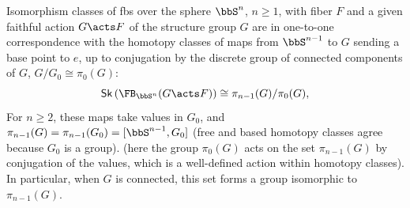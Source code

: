\begin{cor}
     Isomorphism classes of \glspl{fb} over the sphere $\bbS^n$, $n\geq 1$, with fiber $F$ and a given faithful action $G\acts F$ of the structure group $G$ are in one-to-one correspondence with the homotopy classes of maps from $\bbS^{n-1}$ to $G$ sending a base point to $e$, up to conjugation by the discrete group of connected components of $G$, $G\slash G_0\cong \pi_0(G)$:
    \[
    \mathsf{Sk}\left(\FB_{\bbS^n}(G\acts F)\right)\cong \pi_{n-1}(G)/\pi_0(G),\label{FB(G) and homotopy(G)}
    \]
    For $n\geq 2$, these maps take values in $G_0$, and $\pi_{n-1}(G)=\pi_{n-1}(G_0)=[\bbS^{n-1},G_0]$ (free and based homotopy classes agree because $G_0$ is a group).
    (here the group $\pi_0(G)$ acts on the set $\pi_{n-1}(G)$ by conjugation of the values, which is a well-defined action within homotopy classes). In particular, when $G$ is connected, this set forms a group isomorphic to $\pi_{n-1}(G)$.
\end{cor}
